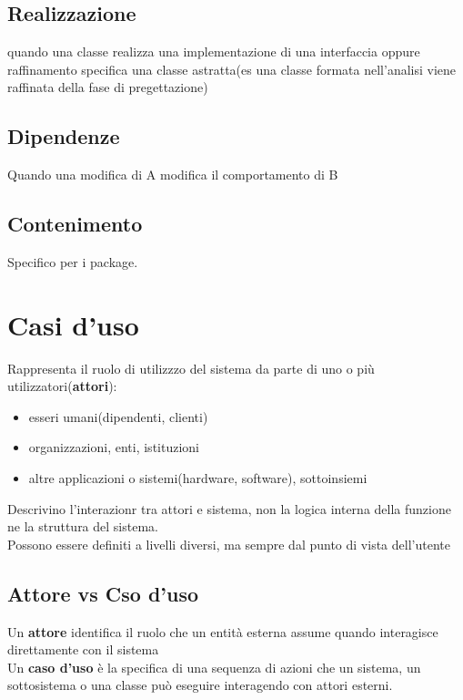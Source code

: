 \documentclass{report}
\begin{document}
            \subsection{Realizzazione}
                quando una classe realizza una implementazione di una interfaccia oppure raffinamento specifica una classe astratta(es una classe formata nell'analisi viene raffinata della fase di pregettazione) 
            \subsection{Dipendenze}
                Quando una modifica di A modifica il comportamento di B
            \subsection{Contenimento}
                Specifico per i package.
           \section{Casi d'uso}
                Rappresenta il ruolo di utilizzzo del sistema da parte di uno o più utilizzatori(\textbf{attori}):
                \begin{itemize}
                    \item esseri umani(dipendenti, clienti)
                    \item organizzazioni, enti, istituzioni
                    \item altre applicazioni o sistemi(hardware, software), sottoinsiemi
                \end{itemize}
                Descrivino l'interazionr tra attori e sistema, non la logica interna della funzione ne la struttura del sistema.
                \\
                Possono essere definiti a livelli diversi, ma sempre dal punto di vista dell'utente
                \subsection{Attore vs Cso d'uso}
                    Un \textbf{attore} identifica il ruolo che un entità esterna assume quando interagisce direttamente con il sistema
                    \\
                    Un \textbf{caso d'uso} è la specifica di una sequenza di azioni che un sistema, un sottosistema  o una classe può eseguire interagendo con attori esterni.
\end{document}
